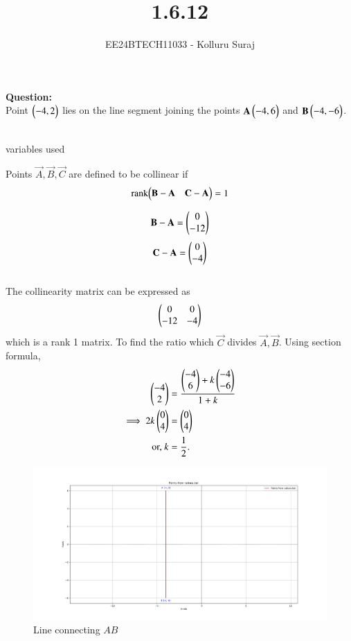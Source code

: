 \documentclass[journal]{IEEEtran}
\begin{document}

\vspace{3cm}

\title{1.6.12}
\author{EE24BTECH11033 - Kolluru Suraj}
{\let\newpage\relax\maketitle}
\renewcommand{\thefigure}{\theenumi}
\renewcommand{\thetable}{\theenumi}
\setlength{\intextsep}{10pt} %
\renewcommand{\thetable}{\theenumi}
\textbf{Question:}\\
Point $ \begin{pmatrix}-4, 2\end{pmatrix}$ lies on the line segment joining the points $\mathbf{A}\begin{pmatrix}-4, 6\end{pmatrix}$  and  $\mathbf{B}\begin{pmatrix}-4, -6\end{pmatrix}$.
\\
\solution\\
\begin{table}[h!]
  \centering
  
  \caption{variables used}
  \label{tabQuestion-1.6.12}
\end{table}


Points $\vec{A}, \vec{B}, \vec{C}$ are defined to be collinear if 
		\begin{align}
			\label{eq:line-rank-2}
			\text{rank}{\ensuremath{\begin{pmatrix}\mathbf{B}-\mathbf{A}& \mathbf{C}-\mathbf{A}\end{pmatrix}}} = 1
		\end{align}

  \begin{align}
 \mathbf{B}-\mathbf{A}=\begin{pmatrix} 0\\ -12\end{pmatrix}
\end{align}
\begin{align}
 \mathbf{C}-\mathbf{A}=\begin{pmatrix} 0\\ -4\end{pmatrix}
\end{align}\\
The collinearity matrix can be expressed as
 \begin{align}
			    \begin{pmatrix}0 & 0\\-12 & -4 \end{pmatrix}  
\end{align}
which is a rank 1 matrix.
To find the ratio which $\vec{C}$ divides $\vec{A},\vec{B}$. Using section formula,
\begin{align}
         \begin{pmatrix}-4\\2\end{pmatrix} &=\frac{{\begin{pmatrix}-4\\6\end{pmatrix}+k\begin{pmatrix}-4\\-6\end{pmatrix}}}{1+k}\\
	 \implies 2k\begin{pmatrix}0 \\ 4\end{pmatrix} &=\begin{pmatrix}0 \\ 4\end{pmatrix}
	 \\
	 \text{or, } k &= \frac{1}{2}.
\end{align}

\begin{figure}[h!]
   \centering
   \includegraphics[width=0.7\linewidth]{figs/Figure_1.png}
   \caption{Line connecting $AB$}
   \label{stemplot}
\end{figure}
	
\end{document}
